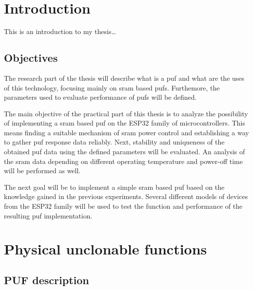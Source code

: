 \chapter{Introduction}

    This is an introduction to my thesis\ldots

\section{Objectives}

The research part of the thesis will describe what is a \gls{puf} and what are the uses of this technology, focusing mainly on \gls{sram} based \glspl{puf}. Furthemore, the parameters used to evaluate performance of \glspl{puf} will be defined.

The main objective of the practical part of this thesis is to analyze the possibility of implementing a \gls{sram} based \gls{puf} on the ESP32 family of microcontrollers. This means finding a suitable mechanism of \gls{sram} power control and establishing a way to gather \gls{puf} response data reliably. Next, stability and uniqueness of the obtained \gls{puf} data using the defined parameters will be evaluated. An analysis of the \gls{sram} data depending on different operating temperature and power-off time will be performed as well.

The next goal will be to implement a simple \gls{sram} based \gls{puf} based on the knowledge gained in the previous experiments. Several different models of devices from the ESP32 family will be used to test the function and performance of the resulting \gls{puf} implementation.\cite{Sestakova2018}

\chapter{Physical unclonable functions}

\section{PUF description}


